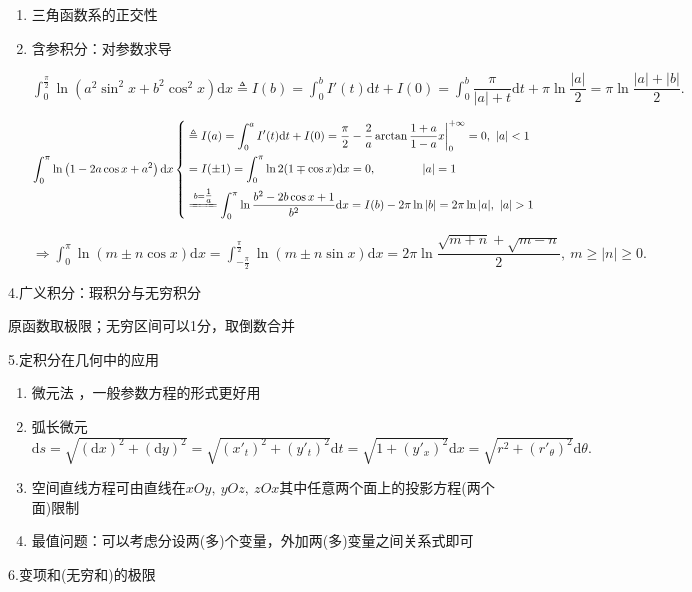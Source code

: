 \documentclass[UTF8]{ctexart}
\newcommand\dif{\mathrm{d}}
\newcommand\no{\noindent}
\newcommand\dis{\displaystyle}
\newcommand\gs{\geqslant}
\newcommand\intd{\dis\int}
\begin{document}
\begin{spacing}{2}
\begin{enumerate}[itemindent=1.4em, label=(\arabic*)]
\item 三角函数系的正交性

\item 含参积分：对参数求导

$\intd_0^{\tfrac{\pi}{2}}\ln\left(a^2\sin^2x+b^2\cos^2x\right)\dif x
\triangleq I(b)
=\intd_0^{b}I'(t)\dif t+I(0)
=\intd_0^{b}\dfrac{\pi}{|a|+t}\dif t+\pi\ln\dfrac{|a|}{2}
=\pi\ln\dfrac{|a|+|b|}{2}.$

$\intd_0^\pi\ln\left(1-2a\cos x+a^2\right)\dif x
\left\{\begin{aligned}
&\triangleq I(a)=\intd_0^{a}I'(t)\dif t+I(0)
=\dfrac{\pi}{2}-\dfrac{2}{a}\arctan\dfrac{1+a}{1-a}x\bigg|_0^{+\infty}=0,\ |a|<1\\
&=I(\pm1)=\intd_0^\pi\ln2(1\mp\cos x)\dif x=0,\qquad\qquad |a|=1\\
&\xlongequal{b=\tfrac{1}{a}}
\intd_0^\pi\ln\dfrac{b^2-2b\cos x+1}{b^2}\dif x
=I(b)-2\pi\ln|b|=2\pi\ln|a|,\ |a|>1\\
\end{aligned}\right.$

\textcolor[rgb]{1,0,0}{$\Longrightarrow\intd_0^\pi\ln(m\pm n\cos x)\dif x
=\intd_{-\tfrac{\pi}{2}}^{\tfrac{\pi}{2}}\ln(m\pm n\sin x)\dif x
=2\pi\ln\dfrac{\sqrt{m+n}+\sqrt{m-n}}{2},\ m\gs |n|\gs 0.$}

\end{enumerate}

\no4.广义积分：瑕积分与无穷积分

原函数取极限；无穷区间可以1分，取倒数合并

\no5.定积分在几何中的应用

\begin{enumerate}[itemindent=1.4em, label=(\arabic*)]

\item  微元法 ，一般参数方程的形式更好用

\item 弧长微元$\dis\dif s=\sqrt{(\dif x)^2+(\dif y)^2}=\sqrt{(x'_t)^2+(y'_t)^2}\dif t
=\sqrt{1+(y'_x)^2}\dif x=\sqrt{r^2+(r'_\theta)^2}\dif \theta.$

\item 空间直线方程可由直线在$xOy,\ yOz,\ zOx$其中任意两个面上的投影方程(两个面)限制

\item 最值问题：可以考虑分设两(多)个变量，外加两(多)变量之间关系式即可

\end{enumerate}

\no6.变项和(无穷和)的极限


\end{spacing}
\end{document}

